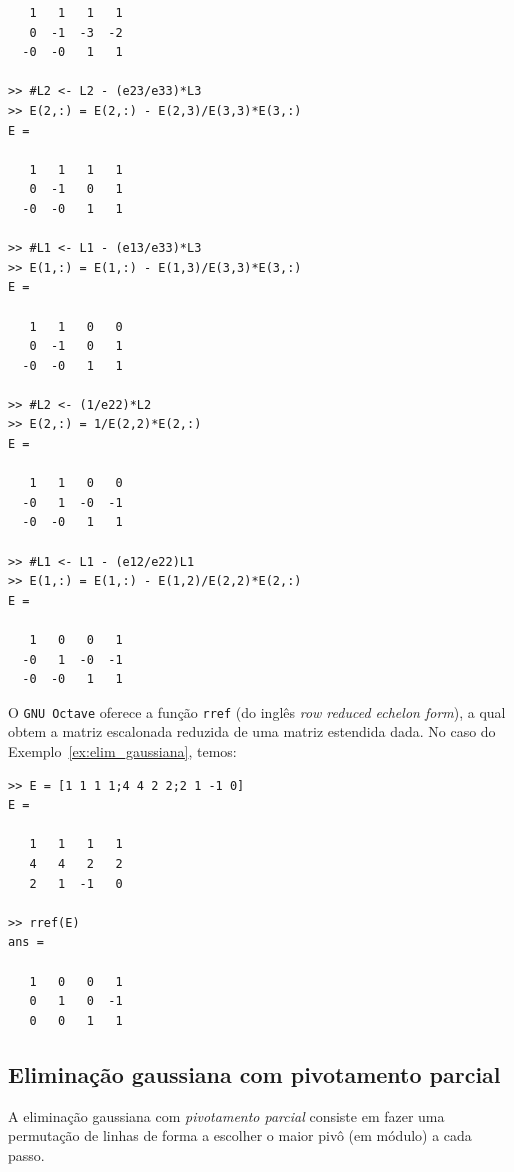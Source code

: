\begin{ex}
\begin{verbatim}
   1   1   1   1
   0  -1  -3  -2
  -0  -0   1   1

>> #L2 <- L2 - (e23/e33)*L3
>> E(2,:) = E(2,:) - E(2,3)/E(3,3)*E(3,:)
E =

   1   1   1   1
   0  -1   0   1
  -0  -0   1   1

>> #L1 <- L1 - (e13/e33)*L3
>> E(1,:) = E(1,:) - E(1,3)/E(3,3)*E(3,:)
E =

   1   1   0   0
   0  -1   0   1
  -0  -0   1   1

>> #L2 <- (1/e22)*L2
>> E(2,:) = 1/E(2,2)*E(2,:)
E =

   1   1   0   0
  -0   1  -0  -1
  -0  -0   1   1

>> #L1 <- L1 - (e12/e22)L1
>> E(1,:) = E(1,:) - E(1,2)/E(2,2)*E(2,:)
E =

   1   0   0   1
  -0   1  -0  -1
  -0  -0   1   1
\end{verbatim}
\fi
\end{ex}

\ifisoctave
\begin{obs}
O \verb+GNU Octave+ oferece a função \verb+rref+ (do inglês {\it row reduced echelon form}), a qual obtem a matriz escalonada reduzida de uma matriz estendida dada. No caso do Exemplo~\ref{ex:elim_gaussiana}, temos:
\begin{verbatim}
>> E = [1 1 1 1;4 4 2 2;2 1 -1 0]
E =

   1   1   1   1
   4   4   2   2
   2   1  -1   0

>> rref(E)
ans =

   1   0   0   1
   0   1   0  -1
   0   0   1   1
\end{verbatim}
\end{obs}
\fi


\subsection{Eliminação gaussiana com pivotamento parcial}
A eliminação gaussiana com \emph{pivotamento parcial} consiste em fazer uma permutação de linhas de forma a escolher o maior pivô (em módulo) a cada passo.


